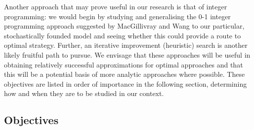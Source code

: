 \documentclass[hidelinks,a4paper,11pt]{article}
\numberwithin{equation}{section}
\begin{document}
Another approach that may prove useful in our research is that of integer programming: we would begin by studying and generalising the 0-1 integer programming approach suggested by MacGillivray and Wang \cite{macgillivray03} to our particular, stochastically founded model and seeing whether this could provide a route to optimal strategy. Further, an iterative improvement (heuristic) search is another likely fruitful path to pursue. We envisage that these approaches will be useful in obtaining relatively successful approximations for optimal approaches and that this will be a potential basis of more analytic approaches where possible. These objectives are listed in order of importance in the following section, determining how and when they are to be studied in our context.

\subsection{Objectives}
\label{sec:objectives}
\end{document}
